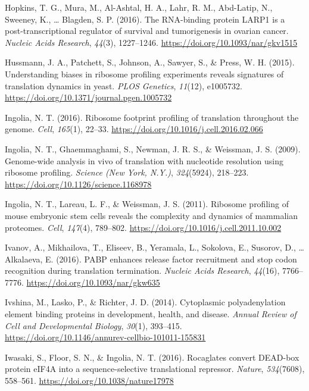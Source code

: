 \documentclass[12pt,openany]{book}
\begin{document}
\hypertarget{ref-Hopkins2016}{}
Hopkins, T. G., Mura, M., Al-Ashtal, H. A., Lahr, R. M., Abd-Latip, N.,
Sweeney, K., \ldots{} Blagden, S. P. (2016). The RNA-binding protein
LARP1 is a post-transcriptional regulator of survival and tumorigenesis
in ovarian cancer. \emph{Nucleic Acids Research}, \emph{44}(3),
1227--1246. \url{https://doi.org/10.1093/nar/gkv1515}

\hypertarget{ref-Hussmann2015}{}
Hussmann, J. A., Patchett, S., Johnson, A., Sawyer, S., \& Press, W. H.
(2015). Understanding biases in ribosome profiling experiments reveals
signatures of translation dynamics in yeast. \emph{PLOS Genetics},
\emph{11}(12), e1005732.
\url{https://doi.org/10.1371/journal.pgen.1005732}

\hypertarget{ref-Ingolia2016}{}
Ingolia, N. T. (2016). Ribosome footprint profiling of translation
throughout the genome. \emph{Cell}, \emph{165}(1), 22--33.
\url{https://doi.org/10.1016/j.cell.2016.02.066}

\hypertarget{ref-Ingolia2009}{}
Ingolia, N. T., Ghaemmaghami, S., Newman, J. R. S., \& Weissman, J. S.
(2009). Genome-wide analysis in vivo of translation with nucleotide
resolution using ribosome profiling. \emph{Science (New York, N.Y.)},
\emph{324}(5924), 218--223.
\url{https://doi.org/10.1126/science.1168978}

\hypertarget{ref-Ingolia2011}{}
Ingolia, N. T., Lareau, L. F., \& Weissman, J. S. (2011). Ribosome
profiling of mouse embryonic stem cells reveals the complexity and
dynamics of mammalian proteomes. \emph{Cell}, \emph{147}(4), 789--802.
\url{https://doi.org/10.1016/j.cell.2011.10.002}

\hypertarget{ref-Ivanov2016}{}
Ivanov, A., Mikhailova, T., Eliseev, B., Yeramala, L., Sokolova, E.,
Susorov, D., \ldots{} Alkalaeva, E. (2016). PABP enhances release factor
recruitment and stop codon recognition during translation termination.
\emph{Nucleic Acids Research}, \emph{44}(16), 7766--7776.
\url{https://doi.org/10.1093/nar/gkw635}

\hypertarget{ref-Ivshina2014}{}
Ivshina, M., Lasko, P., \& Richter, J. D. (2014). Cytoplasmic
polyadenylation element binding proteins in development, health, and
disease. \emph{Annual Review of Cell and Developmental Biology},
\emph{30}(1), 393--415.
\url{https://doi.org/10.1146/annurev-cellbio-101011-155831}

\hypertarget{ref-Iwasaki2016}{}
Iwasaki, S., Floor, S. N., \& Ingolia, N. T. (2016). Rocaglates convert
DEAD-box protein eIF4A into a sequence-selective translational
repressor. \emph{Nature}, \emph{534}(7608), 558--561.
\url{https://doi.org/10.1038/nature17978}
\end{document}

